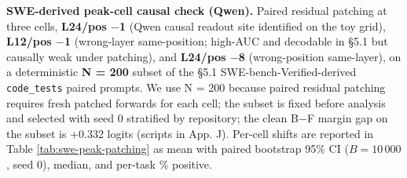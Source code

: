 \documentclass[
  11pt,
  a4paper]{article}
\begin{document}
\textbf{SWE-derived peak-cell causal check (Qwen).} Paired residual
patching at three cells, \textbf{L24/pos \ensuremath{-}1} (Qwen causal readout site
identified on the toy grid), \textbf{L12/pos \ensuremath{-}1} (wrong-layer
same-position; high-AUC and decodable in \S{}5.1 but causally weak under
patching), and \textbf{L24/pos \ensuremath{-}8} (wrong-position same-layer), on a
deterministic \textbf{N = 200} subset of the \S{}5.1
SWE-bench-Verified-derived \texttt{code\_tests} paired prompts. We use N
= 200 because paired residual patching requires fresh patched forwards
for each cell; the subset is fixed before analysis and selected with
seed 0 stratified by repository; the clean B\ensuremath{-}F margin gap on the subset
is +0.332 logits (scripts in App. J). Per-cell shifts are reported in
Table \ref{tab:swe-peak-patching} as mean with paired bootstrap 95\% CI
(\(B = 10\,000\), seed 0), median, and per-task \% positive.

\begin{table}[t]
\caption{\textbf{SWE-derived peak-cell patching check on Qwen.} Paired
residual patching on a deterministic $N = 200$ SWE-bench-Verified-derived
subset (seed 0, stratified by repository). L24/pos $-1$ is the Qwen
causal readout site identified on the toy grid; L12/pos $-1$ is a
high-AUC wrong-layer same-position control; L24/pos $-8$ is a
wrong-position same-layer control.}
\label{tab:swe-peak-patching}
\centering
\setlength{\tabcolsep}{4pt}
\end{table}
\end{document}
